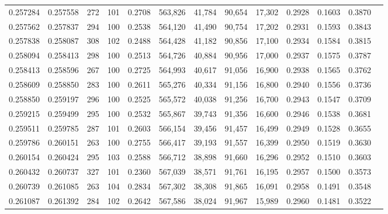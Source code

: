 \begin{tabular}{rrrrrrrrrrrrr}
0.257284 & 0.257558 &   272 & 101 &                                     0.2708 & 563,826 &  41,784 &  90,654 &  17,302 & 0.2928 & 0.1603 & 0.3870 \\
0.257562 & 0.257837 &   294 & 100 &                                     0.2538 & 564,120 &  41,490 &  90,754 &  17,202 & 0.2931 & 0.1593 & 0.3843 \\
0.257838 & 0.258087 &   308 & 102 &                                     0.2488 & 564,428 &  41,182 &  90,856 &  17,100 & 0.2934 & 0.1584 & 0.3815 \\
0.258094 & 0.258413 &   298 & 100 &                                     0.2513 & 564,726 &  40,884 &  90,956 &  17,000 & 0.2937 & 0.1575 & 0.3787 \\
0.258413 & 0.258596 &   267 & 100 &                                     0.2725 & 564,993 &  40,617 &  91,056 &  16,900 & 0.2938 & 0.1565 & 0.3762 \\
0.258609 & 0.258850 &   283 & 100 &                                     0.2611 & 565,276 &  40,334 &  91,156 &  16,800 & 0.2940 & 0.1556 & 0.3736 \\
0.258850 & 0.259197 &   296 & 100 &                                     0.2525 & 565,572 &  40,038 &  91,256 &  16,700 & 0.2943 & 0.1547 & 0.3709 \\
0.259215 & 0.259499 &   295 & 100 &                                     0.2532 & 565,867 &  39,743 &  91,356 &  16,600 & 0.2946 & 0.1538 & 0.3681 \\
0.259511 & 0.259785 &   287 & 101 &                                     0.2603 & 566,154 &  39,456 &  91,457 &  16,499 & 0.2949 & 0.1528 & 0.3655 \\
0.259786 & 0.260151 &   263 & 100 &                                     0.2755 & 566,417 &  39,193 &  91,557 &  16,399 & 0.2950 & 0.1519 & 0.3630 \\
0.260154 & 0.260424 &   295 & 103 &                                     0.2588 & 566,712 &  38,898 &  91,660 &  16,296 & 0.2952 & 0.1510 & 0.3603 \\
0.260432 & 0.260737 &   327 & 101 &                                     0.2360 & 567,039 &  38,571 &  91,761 &  16,195 & 0.2957 & 0.1500 & 0.3573 \\
0.260739 & 0.261085 &   263 & 104 &                                     0.2834 & 567,302 &  38,308 &  91,865 &  16,091 & 0.2958 & 0.1491 & 0.3548 \\
0.261087 & 0.261392 &   284 & 102 &                                     0.2642 & 567,586 &  38,024 &  91,967 &  15,989 & 0.2960 & 0.1481 & 0.3522 \\

\end{tabular}
